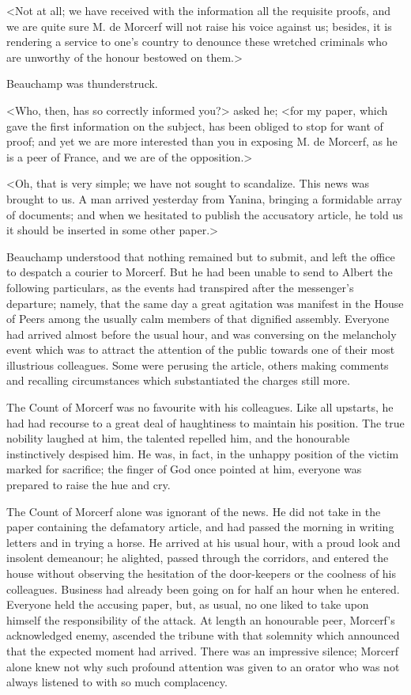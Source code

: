  <Not at all; we have received with the information all the requisite proofs, and we are quite sure M. de Morcerf will not raise his voice against us; besides, it is rendering a service to one's country to denounce these wretched criminals who are unworthy of the honour bestowed on them.> 

 Beauchamp was thunderstruck. 

 <Who, then, has so correctly informed you?> asked he; <for my paper, which gave the first information on the subject, has been obliged to stop for want of proof; and yet we are more interested than you in exposing M. de Morcerf, as he is a peer of France, and we are of the opposition.> 

 <Oh, that is very simple; we have not sought to scandalize. This news was brought to us. A man arrived yesterday from Yanina, bringing a formidable array of documents; and when we hesitated to publish the accusatory article, he told us it should be inserted in some other paper.> 

 Beauchamp understood that nothing remained but to submit, and left the office to despatch a courier to Morcerf. But he had been unable to send to Albert the following particulars, as the events had transpired after the messenger's departure; namely, that the same day a great agitation was manifest in the House of Peers among the usually calm members of that dignified assembly. Everyone had arrived almost before the usual hour, and was conversing on the melancholy event which was to attract the attention of the public towards one of their most illustrious colleagues. Some were perusing the article, others making comments and recalling circumstances which substantiated the charges still more. 

 The Count of Morcerf was no favourite with his colleagues. Like all upstarts, he had had recourse to a great deal of haughtiness to maintain his position. The true nobility laughed at him, the talented repelled him, and the honourable instinctively despised him. He was, in fact, in the unhappy position of the victim marked for sacrifice; the finger of God once pointed at him, everyone was prepared to raise the hue and cry. 

 The Count of Morcerf alone was ignorant of the news. He did not take in the paper containing the defamatory article, and had passed the morning in writing letters and in trying a horse. He arrived at his usual hour, with a proud look and insolent demeanour; he alighted, passed through the corridors, and entered the house without observing the hesitation of the door-keepers or the coolness of his colleagues.  Business had already been going on for half an hour when he entered. Everyone held the accusing paper, but, as usual, no one liked to take upon himself the responsibility of the attack. At length an honourable peer, Morcerf's acknowledged enemy, ascended the tribune with that solemnity which announced that the expected moment had arrived. There was an impressive silence; Morcerf alone knew not why such profound attention was given to an orator who was not always listened to with so much complacency. 

